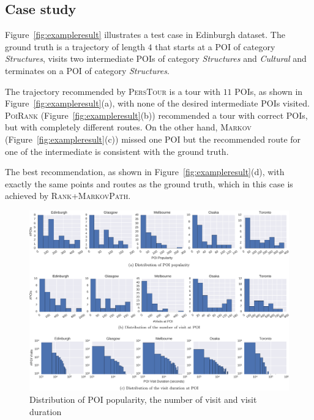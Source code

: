 \subsection{Case study}
\label{sec:casestudy}


Figure~\ref{fig:exampleresult} illustrates a test case in Edinburgh dataset.
The ground truth is a trajectory of length $4$ that starts at a POI of category \textit{Structures},
visits two intermediate POIs of category \textit{Structures} and \textit{Cultural} and 
terminates on a POI of category \textit{Structures}.

The trajectory recommended by \textsc{PersTour} is a tour with $11$ POIs, as shown in Figure~\ref{fig:exampleresult}(a),
with none of the desired intermediate POIs visited.
\textsc{PoiRank} (Figure~\ref{fig:exampleresult}(b)) recommended a tour with correct POIs, but with completely different routes.
On the other hand, \textsc{Markov} (Figure~\ref{fig:exampleresult}(c)) missed one POI but the recommended route for one of 
the intermediate is consistent with the ground truth.

The best recommendation, as shown in Figure~\ref{fig:exampleresult}(d), with exactly the same points and routes as the ground truth,
which in this case is achieved by \textsc{Rank+MarkovPath}.



\begin{figure}[t]
\includegraphics[width=\textwidth]{fig/feature_distro.pdf}
\caption{Distribution of POI popularity, the number of visit and visit duration}
\label{fig:distro}\captionmoveup
\end{figure}
